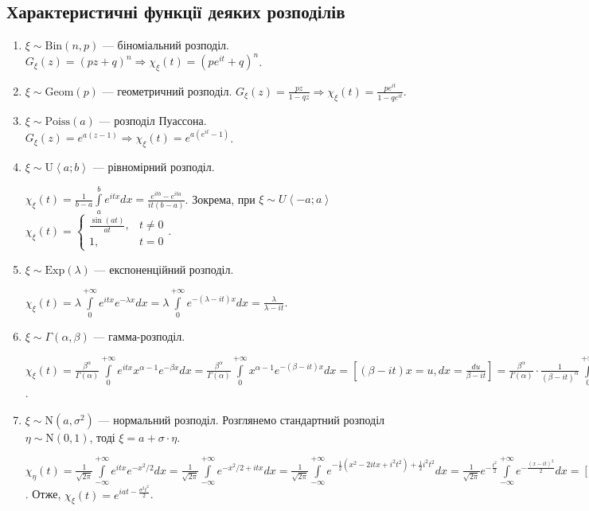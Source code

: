 \subsection{Характеристичні функції деяких розподілів}
\begin{enumerate}
    \item $\xi \sim \mathrm{Bin}(n,p)$ --- біноміальний розподіл.
    $G_\xi(z) = (pz+q)^n \Rightarrow \chi_\xi(t) = \left( p e^{it} + q\right)^n$.
    \item $\xi \sim \mathrm{Geom}(p)$ --- геометричний розподіл.
    $G_\xi(z) = \frac{pz}{1-qz} \Rightarrow \chi_\xi(t) = \frac{p e^{it}}{1-q e^{it}}$.
    \item $\xi \sim \mathrm{Poiss}(a)$ --- розподіл Пуассона.
    $G_\xi(z) = e^{a(z-1)} \Rightarrow \chi_\xi(t) = e^{a(e^{it}-1)}$.
    \item $\xi \sim \mathrm{U}\left< a; b\right>$ --- рівномірний розподіл.

    $\chi_\xi(t) = \frac{1}{b-a} \int\limits_a^b e^{itx} dx = \frac{e^{itb} - e^{ita}}{it(b-a)}$.
    Зокрема, при $\xi \sim {U}\left< -a; a\right>$ $\chi_\xi(t) = \begin{cases}
        \frac{\sin(at)}{at}, & t \neq 0 \\
        1, & t = 0
    \end{cases}$.
    \item $\xi \sim \mathrm{Exp}(\lambda)$ --- експоненційний розподіл.
    
    $\chi_\xi(t) = \lambda \int\limits_0^{+\infty} e^{itx} e^{-\lambda x} dx = \lambda \int\limits_0^{+\infty} e^{-(\lambda-it)x} dx = \frac{\lambda}{\lambda - it}$.
    \item $\xi \sim \Gamma(\alpha, \beta)$ --- гамма-розподіл.
    
    $\chi_\xi(t) = \frac{\beta^\alpha}{\Gamma(\alpha)} \int\limits_0^{+\infty} e^{itx} x^{\alpha-1} e^{-\beta x} dx =
    \frac{\beta^\alpha}{\Gamma(\alpha)} \int\limits_0^{+\infty} x^{\alpha-1} e^{-(\beta-it) x} dx = \left[ (\beta-it) x = u, dx = \frac{du}{\beta-it}\right] = 
    \frac{\beta^\alpha}{\Gamma(\alpha)} \cdot \frac{1}{(\beta-it)^\alpha} \int\limits_0^{+\infty} u^{\alpha-1} e^{-u} du = 
    \frac{\beta^\alpha}{\Gamma(\alpha)} \cdot \frac{1}{(\beta-it)^\alpha} \cdot \Gamma(\alpha) = (1-\frac{it}{\beta})^{-\alpha}$.
    \item $\xi \sim \mathrm{N}(a, \sigma^2)$ --- нормальний розподіл. Розглянемо стандартний розподіл $\eta \sim \mathrm{N}(0, 1)$,
    тоді $\xi = a + \sigma\cdot\eta$.

    $\chi_\eta(t) = \frac{1}{\sqrt{2\pi}} \int\limits_{-\infty}^{+\infty} e^{itx} e^{-x^2/2} dx = 
    \frac{1}{\sqrt{2\pi}} \int\limits_{-\infty}^{+\infty} e^{-x^2/2 + itx} dx = 
    \frac{1}{\sqrt{2\pi}} \int\limits_{-\infty}^{+\infty} e^{-\frac{1}{2}(x^2 - 2itx + i^2t^2) + \frac{1}{2}i^2t^2} dx = 
    \frac{1}{\sqrt{2\pi}} e^{-\frac{t^2}{2}} \int\limits_{-\infty}^{+\infty} e^{-\frac{(x-it)^2}{2}} dx = 
    \left[ x-it = u, dx = du\right] = e^{-\frac{t^2}{2}}$.
    Отже, $\chi_\xi(t) = e^{iat - \frac{\sigma^2 t^2}{2}}$.
\end{enumerate}

